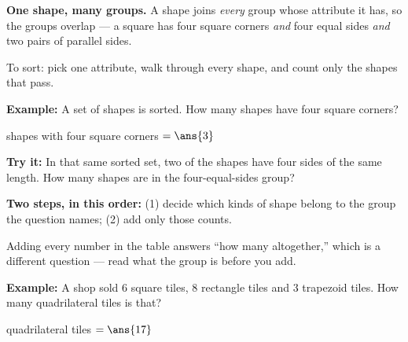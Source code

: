 \documentclass[12pt]{article}
\begin{document}

\begin{formulabox}
\textbf{One shape, many groups.} A shape joins \emph{every} group whose attribute it has, so the
groups overlap --- a square has four square corners \emph{and} four equal sides \emph{and} two pairs
of parallel sides.\par
To sort: pick one attribute, walk through every shape, and count only the shapes that pass.
\end{formulabox}

\begin{examplebox}
\textbf{Example:} \quad A set of shapes is sorted. How many shapes have four square corners?

shapes with four square corners $= \ans{3}$
\end{examplebox}

\begin{tryitbox}
\textbf{Try it:} \quad In that same sorted set, two of the shapes have four sides of the same length.
How many shapes are in the four-equal-sides group?\\[2pt]
\end{tryitbox}


\begin{formulabox}
\textbf{Two steps, in this order:} (1) decide which kinds of shape belong to the group the question
names; (2) add only those counts.\par
Adding every number in the table answers ``how many altogether,'' which is a different question ---
read what the group is before you add.
\end{formulabox}

\begin{examplebox}
\textbf{Example:} \quad A shop sold $6$ square tiles, $8$ rectangle tiles and $3$ trapezoid tiles.
How many quadrilateral tiles is that?

quadrilateral tiles $= \ans{17}$
\end{examplebox}
\end{document}
